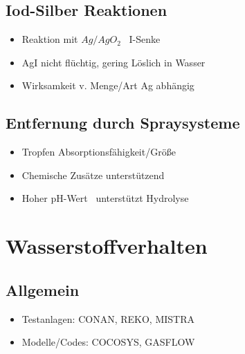 \documentclass[12pt]{article}
\begin{document}
\subsection{Iod-Silber Reaktionen}
\begin{itemize}[noitemsep]
	\item Reaktion mit \(Ag/AgO_2\) \textrightarrow\ I-Senke
	\item AgI nicht flüchtig, gering Löslich in Wasser
	\item Wirksamkeit v. Menge/Art Ag abhängig
\end{itemize}

\subsection{Entfernung durch Spraysysteme}
\begin{itemize}[noitemsep]
	\item Tropfen Absorptionsfähigkeit/Größe
	\item Chemische Zusätze unterstützend
	\item Hoher pH-Wert \textrightarrow\ unterstützt Hydrolyse
\end{itemize}

\section{Wasserstoffverhalten}

\subsection{Allgemein}
\begin{itemize}[noitemsep]
	\item Testanlagen: CONAN, REKO, MISTRA
	\item Modelle/Codes: COCOSYS, GASFLOW
\end{itemize}
\end{document}
